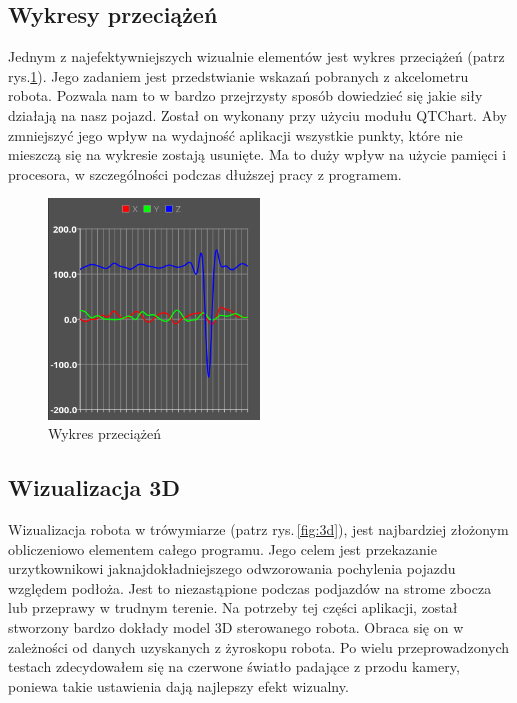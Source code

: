 \documentclass[12pt,a4paper,polish]{article}
\begin{document}
  \subsection{Wykresy przeciążeń}
  Jednym z najefektywniejszych wizualnie elementów jest wykres przeciążeń (patrz rys.\ref{fig:chart}).
  Jego zadaniem jest przedstwianie wskazań pobranych z akcelometru robota.
  Pozwala nam to w bardzo przejrzysty sposób dowiedzieć się jakie siły
  działają na nasz pojazd. Został on wykonany przy użyciu modułu QTChart.
  Aby zmniejszyć jego wpływ na wydajność aplikacji wszystkie punkty, które
  nie mieszczą się na wykresie zostają usunięte. Ma to duży wpływ na użycie
  pamięci i procesora, w szczególności podczas dłuższej pracy z programem.

  \begin{figure}[h]
    \centering
    \includegraphics[width=0.5\textwidth]{img/final/chart.png}
    \caption{Wykres przeciążeń}
    \label{fig:chart}
  \end{figure}

  \subsection{Wizualizacja 3D}
  Wizualizacja robota w trówymiarze (patrz rys.\,\ref{fig:3d}), jest najbardziej złożonym obliczeniowo
  elementem całego programu. Jego celem jest przekazanie urzytkownikowi 
  jaknajdokładniejszego odwzorowania pochylenia pojazdu względem podłoża.
  Jest to niezastąpione podczas podjazdów na strome zbocza lub przeprawy 
  w trudnym terenie. Na potrzeby tej części aplikacji, został stworzony
  bardzo dokłady model 3D sterowanego robota. Obraca się on  w zależności 
  od danych uzyskanych z żyroskopu robota. Po wielu przeprowadzonych
  testach zdecydowałem się na czerwone światło padające z przodu kamery,
  poniewa takie ustawienia dają najlepszy efekt wizualny.
\end{document}
